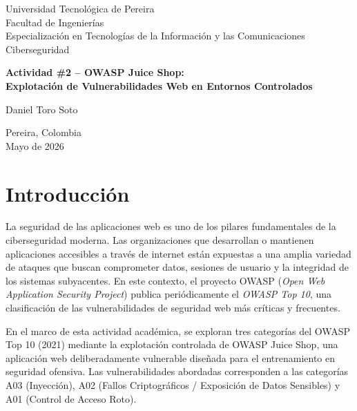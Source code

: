 \documentclass[12pt, letterpaper]{article}
\begin{document}
\begin{titlepage}
  \centering
  \vspace*{2cm}

  {\large Universidad Tecnológica de Pereira\\
  Facultad de Ingenierías\\
  Especialización en Tecnologías de la Información y las Comunicaciones\\[0.5em]
  Ciberseguridad}

  \vspace{3cm}

  {\LARGE \textbf{Actividad \#2 -- OWASP Juice Shop:\\
  Explotación de Vulnerabilidades Web en Entornos Controlados}}

  \vspace{3cm}

  {\large Daniel Toro Soto}

  \vfill

  {\large Pereira, Colombia\\
  Mayo de 2026}
\end{titlepage}

\tableofcontents
\newpage

\section{Introducción}

La seguridad de las aplicaciones web es uno de los pilares fundamentales de la ciberseguridad moderna. Las organizaciones que desarrollan o mantienen aplicaciones accesibles a través de internet están expuestas a una amplia variedad de ataques que buscan comprometer datos, sesiones de usuario y la integridad de los sistemas subyacentes. En este contexto, el proyecto OWASP (\textit{Open Web Application Security Project}) publica periódicamente el \textit{OWASP Top 10}, una clasificación de las vulnerabilidades de seguridad web más críticas y frecuentes.

En el marco de esta actividad académica, se exploran tres categorías del OWASP Top 10 (2021) mediante la explotación controlada de OWASP Juice Shop, una aplicación web deliberadamente vulnerable diseñada para el entrenamiento en seguridad ofensiva. Las vulnerabilidades abordadas corresponden a las categorías A03 (Inyección), A02 (Fallos Criptográficos / Exposición de Datos Sensibles) y A01 (Control de Acceso Roto).
\end{document}
